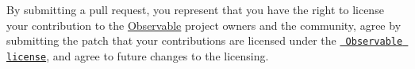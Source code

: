 By submitting a pull request, you represent that you have the right to license your contribution to the \mbox{\hyperlink{class_observable}{Observable}} project owners and the community, agree by submitting the patch that your contributions are licensed under the \href{https://raw.githubusercontent.com/dacap/observable/main/LICENSE.txt}{\texttt{ Observable license}}, and agree to future changes to the licensing. 